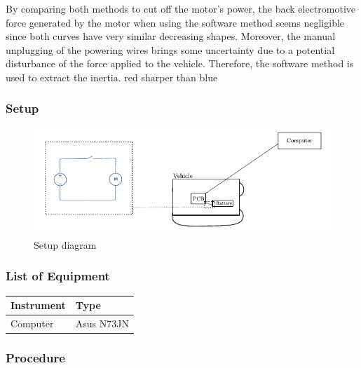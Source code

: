 By comparing both methods to cut off the motor's power, the back electromotive force generated by the motor when using the software method seems negligible since both curves have very similar decreasing shapes. Moreover, the manual unplugging of the powering wires brings some uncertainty due to a potential disturbance of the force applied to the vehicle.
Therefore, the software method is used to extract the inertia.
red sharper than blue

\subsubsection{Setup}
\begin{figure}[H]
	\centering
	\includegraphics[scale=1.6]{figures/inertiaTestSetupDiagram.pdf}
	\caption{Setup diagram}
	\label{inertiaTestSetupDiagram}
\end{figure}

\subsubsection{List of Equipment}

\begin{table}[H]
\begin{tabular}{|p{10cm}|p{4cm}|}
\hline%
  \textbf{Instrument}                     &  \textbf{Type}       \\
\hline%
  Computer                                &  Asus N73JN    \\
\hline %
\end{tabular}
\end{table}

\subsubsection{Procedure}

